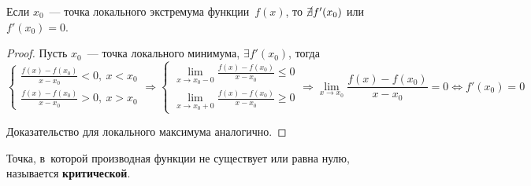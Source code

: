 \begin{theorem}
Если $x_0$~--- точка локального экстремума функции~$f(x)$, то $\raise 0.4mm\hbox{\lefteqn{\mkern -2mu\not}} \exists f'(x_0)$ или $f'(x_0) = 0$.
\end{theorem}
\begin{proof}
Пусть $x_0$~--- точка локального минимума, $\exists f'(x_0)$, тогда
\begin{equation*}
\begin{cases}
\displaystyle \frac{f(x) - f(x_0)}{x - x_0} < 0, \ x < x_0 \\
\displaystyle \frac{f(x) - f(x_0)}{x - x_0} > 0, \ x > x_0
\end{cases} \Rightarrow
\begin{cases}
\displaystyle \lim_{x \to x_0-0} \frac{f(x) - f(x_0)}{x - x_0} \leqslant 0 \\
\displaystyle \lim_{x \to x_0+0} \frac{f(x) - f(x_0)}{x - x_0} \geqslant 0
\end{cases} \Rightarrow
\lim_{x \to x_0} \frac{f(x) - f(x_0)}{x - x_0} = 0 \Leftrightarrow
f'(x_0) = 0
\end{equation*}

Доказательство для локального максимума аналогично.
\end{proof}

 Точка, в~которой производная функции не существует или равна нулю, называется \textbf{критической}.

